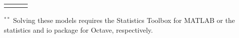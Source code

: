 \documentclass[11pt,a4paper]{article}
\begin{document}
\begin{table}[H]
\begin{tabularx}{\textwidth}{lll}
			
			\hline \hline
			\vspace{-0.2cm}
			
		\end{tabularx} 
		
		\footnotesize \noindent  %
		$ ^{\ast \ast}$ Solving these models requires the Statistics Toolbox for MATLAB or the statistics and io package for Octave, respectively. \\
		
		
	\end{table}
	
\end{document}
